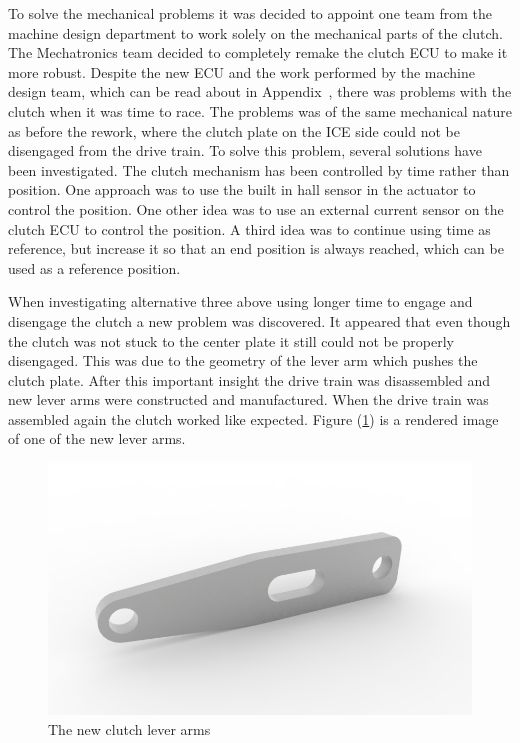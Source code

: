 To solve the mechanical problems it was decided to appoint one team from the
machine design department to work solely on the mechanical parts of the clutch.
The Mechatronics team decided to completely remake the clutch ECU to make it
more robust. Despite the new ECU and the work performed by the machine design
team, which can be read about in Appendix~\cite{MD_report}, there was problems
with the clutch when it was time to race. The problems was of the same
mechanical nature as before the rework, where the clutch plate on the ICE side
could not be disengaged from the drive train. To solve this problem, several
solutions have been investigated. The clutch mechanism has been controlled by
time rather than position. One approach was to use the built in hall sensor in
the actuator to control the position. One other idea was to use an external
current sensor on the clutch ECU to control the position. A third idea was to
continue using time as reference, but increase it so that an end position is
always reached, which can be used as a reference position.

When investigating alternative three above using longer time to engage and
disengage the clutch a new problem was discovered. It appeared that even though
the clutch was not stuck to the center plate it still could not be properly
disengaged. This was due to the geometry of the lever arm which pushes the
clutch plate.  After this important insight the drive train was disassembled and
new lever arms were constructed and manufactured. When the drive train was
assembled again the clutch worked like expected. Figure (\ref{fig:clutch}) is a
rendered image of one of the new lever arms.
\begin{figure}[H]
    \centering
    \includegraphics[width=1\textwidth]{./img/clutch}
    \caption{The new clutch lever arms}\label{fig:clutch}
\end{figure}
